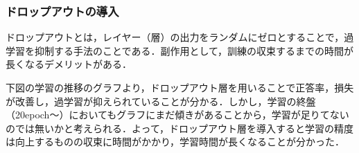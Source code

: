 \documentclass[uplatex,titlepage]{jsarticle}
\newif\iffigure
\begin{document}
\subsubsection{ドロップアウトの導入}
ドロップアウトとは，レイヤー（層）の出力をランダムにゼロとすることで，過学習を抑制する手法のことである．副作用として，訓練の収束するまでの時間が長くなるデメリットがある．
\iffigure
\begin{figure}[H]%
    \begin{center}
    \texttt{[image: dropout\_model.png]} 
    \caption{ドロップアウト層を追加したモデル}
    \end{center}
\end{figure}
\fi
下図の学習の推移のグラフより，ドロップアウト層を用いることで正答率，損失が改善し，過学習が抑えられていることが分かる．しかし，学習の終盤（20epoch～）においてもグラフにまだ傾きがあることから，学習が足りてないのでは無いかと考えられる．よって，ドロップアウト層を導入すると学習の精度は向上するものの収束に時間がかかり，学習時間が長くなることが分かった．
\iffigure
\begin{figure}[H]
\begin{minipage}{8cm}%
  \begin{center}
   \texttt{[image: dropout\_acc.png]} \\
   \caption{ドロップアウトの導入による正答率の推移}
  \end{center}
\end{minipage}
\hfill
\begin{minipage}{8cm}%
  \begin{center}
    \texttt{[image: dropout\_loss.png]} \\
    \caption{ドロップアウトの導入による損失の推移}
  \end{center}
\end{minipage}
\end{figure}
\fi
\end{document}
